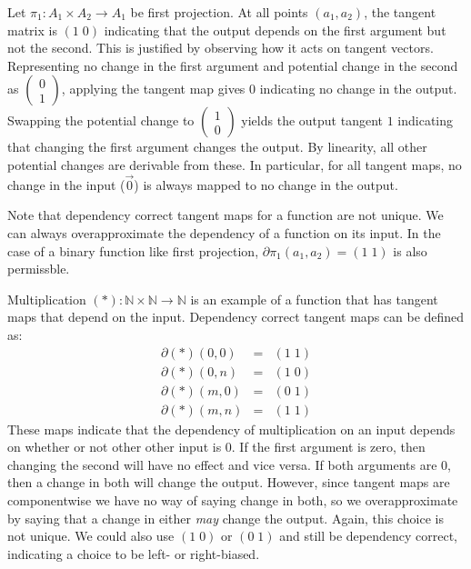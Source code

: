 \begin{example}
  Let $\pi_1 : A_1 \times A_2 \to A_1$ be first projection. At all
  points $(a_1, a_2)$, the tangent matrix is $(1\;0)$ indicating
  that the output depends on the first argument but not the
  second. This is justified by observing how it acts on tangent
  vectors. Representing no change in the first argument and
  potential change in the second as
  $\left(\begin{array}{c} 0 \\ 1 \end{array}\right)$, applying the
  tangent map gives $0$ indicating no change in the output. Swapping
  the potential change to
  $\left(\begin{array}{c} 1 \\ 0 \end{array}\right)$ yields the
  output tangent $1$ indicating that changing the first argument
  changes the output. By linearity, all other potential changes are
  derivable from these. In particular, for all tangent maps, no
  change in the input ($\overrightarrow{0}$) is always mapped to no
  change in the output.
\end{example}

Note that dependency correct tangent maps for a function are
not unique. We can always overapproximate the dependency of a
function on its input. In the case of a binary function like first
projection, $\partial\pi_1(a_1,a_2) = (1\;1)$ is also permissble.

\begin{example}
  Multiplication $(*) : \mathbb{N} \times \mathbb{N} \to \mathbb{N}$
  is an example of a function that has tangent maps that depend on
  the input. Dependency correct tangent maps can be defined as:
  \begin{displaymath}
    \begin{array}{lcl}
      \partial(*)(0,0)&=&(1\;1) \\
      \partial(*)(0,n)&=&(1\;0) \\
      \partial(*)(m,0)&=&(0\;1) \\
      \partial(*)(m,n)&=&(1\;1)
    \end{array}
  \end{displaymath}
  These maps indicate that the dependency of multiplication on an
  input depends on whether or not other other input is $0$. If the
  first argument is zero, then changing the second will have no
  effect and vice versa. If both arguments are $0$, then a change in
  both will change the output. However, since tangent maps are
  componentwise we have no way of saying change in both, so we
  overapproximate by saying that a change in either \emph{may}
  change the output. Again, this choice is not unique. We could also
  use $(1\;0)$ or $(0\;1)$ and still be dependency correct,
  indicating a choice to be left- or right-biased.
\end{example}


